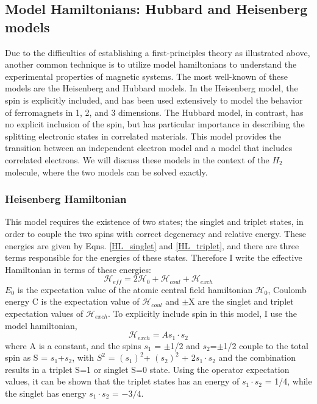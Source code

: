 \subsection{Model Hamiltonians: Hubbard and Heisenberg models}

Due to the difficulties of establishing a first-principles theory as illustrated above, another common technique is to utilize model hamiltonians to understand the experimental properties of magnetic systems. The most well-known of these models are the Heisenberg and Hubbard models. In the Heisenberg model, the spin is explicitly included, and has been used extensively to model the behavior of ferromagnets in 1, 2, and 3 dimensions. The Hubbard model, in contrast, has no explicit inclusion of the spin, but has particular importance in describing the splitting electronic states in correlated materials. This model provides the transition between an independent electron model and a model that includes correlated electrons. We will discuss these models in the context of the $H_2$ molecule, where the two models can be solved exactly. 

\subsubsection{Heisenberg Hamiltonian}

This model requires the existence of two states; the singlet and triplet states, in order to couple the two spins with correct degeneracy and relative energy. These energies are given by Eqns. \ref{HL_singlet} and \ref{HL_triplet}, and there are three terms responsible for the energies of these states. Therefore I write the effective Hamiltonian in terms of these energies:
\begin{equation}
\mathscr{H}_{eff}=2\mathscr{H}_0+\mathscr{H}_{coul}+\mathscr{H}_{exch}
\end{equation}
$E_0$ is the expectation value of the atomic central field hamiltonian $\mathscr{H}_0$, Coulomb energy C is the expectation value of $\mathscr{H}_{coul}$ and $\pm$X are the singlet and triplet expectation values of $\mathscr{H}_{exch}$. To explicitly include spin in this model, I use the model hamiltonian,
\begin{equation}
\mathscr{H}_{exch}=A s_1 \cdot s_2
\end{equation}
where A is a constant, and the spins $s_1$ = $\pm$1/2 and $s_2$=$\pm$1/2 couple to the total spin as S = $s_1$+$s_2$, with $S^2$ = $(s_1)^2$+ $(s_2)^2$ + 2$s_1\cdot s_2$ and the combination results in a triplet S=1 or singlet S=0 state. Using the operator expectation values, it can be shown that the triplet states has an energy of $s_1 \cdot s_2$ = 1/4, while the singlet has energy $s_1 \cdot s_2$ = $-3/4$. 

